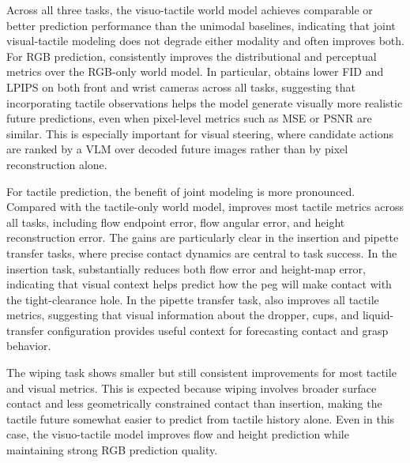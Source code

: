 Across all three tasks, the visuo-tactile world model achieves comparable or better prediction performance than the unimodal baselines, indicating that joint visual-tactile modeling does not degrade either modality and often improves both. For RGB prediction, \ours{} consistently improves the distributional and perceptual metrics over the RGB-only world model. In particular, \ours{} obtains lower FID and LPIPS on both front and wrist cameras across all tasks, suggesting that incorporating tactile observations helps the model generate visually more realistic future predictions, even when pixel-level metrics such as MSE or PSNR are similar. This is especially important for visual steering, where candidate actions are ranked by a VLM over decoded future images rather than by pixel reconstruction alone.

For tactile prediction, the benefit of joint modeling is more pronounced. Compared with the tactile-only world model, \ours{} improves most tactile metrics across all tasks, including flow endpoint error, flow angular error, and height reconstruction error. The gains are particularly clear in the insertion and pipette transfer tasks, where precise contact dynamics are central to task success. In the insertion task, \ours{} substantially reduces both flow error and height-map error, indicating that visual context helps predict how the peg will make contact with the tight-clearance hole. In the pipette transfer task, \ours{} also improves all tactile metrics, suggesting that visual information about the dropper, cups, and liquid-transfer configuration provides useful context for forecasting contact and grasp behavior.

The wiping task shows smaller but still consistent improvements for most tactile and visual metrics. This is expected because wiping involves broader surface contact and less geometrically constrained contact than insertion, making the tactile future somewhat easier to predict from tactile history alone. Even in this case, the visuo-tactile model improves flow and height prediction while maintaining strong RGB prediction quality.

